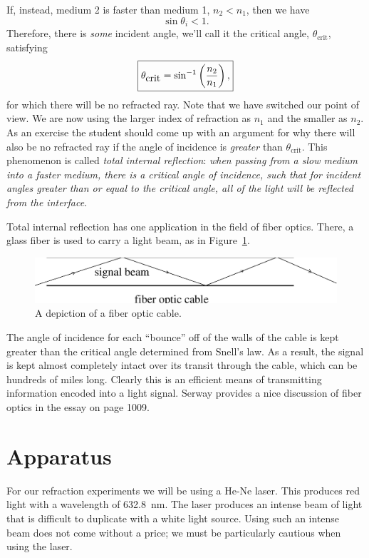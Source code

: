 If, instead, medium 2 is faster than medium 1, $n_2<n_1$, then we have
$$
\sin\theta_i <1.
$$ 
Therefore, there is {\it some} incident angle, we'll call it the critical 
angle, $\theta_{\mbox{crit}}$, satisfying
\begin{equation}
\fbox{$ \displaystyle \theta_{\mbox{crit}}=\sin^{-1}\left(\frac{n_2}{n_1}\right), $}
\label{eq:opt:totintref}
\end{equation}  
for which there will be no refracted ray. Note that
we have switched our point of view.  We are now using the larger index
of refraction as $n_1$ and the smaller as $n_2$.
As an exercise the student should
come up with an argument for why there will also be no refracted ray if the 
angle of incidence is {\it greater} than $\theta_{\mbox{crit}}$. This 
phenomenon is called {\it total internal reflection}: {\it when passing from a 
slow medium into a faster medium, there is a critical angle of incidence, such 
that for incident angles greater than or equal to the critical angle, all of 
the light will be reflected from the interface}.

Total internal reflection has one application in the field of fiber optics.
There, a glass fiber is used to carry a light beam, as in 
Figure~\ref{fig:opt:fiber}.
\begin{figure}[htb]
\centering 
\epsfxsize=12cm \includegraphics[scale=0.6]{8_refraction/fibopt.eps}
\caption{A depiction of a fiber optic cable.}
\label{fig:opt:fiber}
\end{figure}
The angle of incidence for each ``bounce'' off of the walls of the cable is
kept greater than the critical angle determined from Snell's law. As a result,
the signal is kept almost completely intact over its transit through the cable,
which can be hundreds of miles long.  Clearly this is an efficient means of
transmitting information encoded into a light signal. Serway provides a nice
discussion of fiber optics in the essay on page 1009.


\section{Apparatus}

For our refraction experiments we will be using a He-Ne laser.  This produces
red light with a wavelength of 632.8~nm.  The laser produces an intense
beam of light that is difficult to duplicate with a white light source.  Using
such an intense beam does not come without a price; we must be particularly 
cautious when using the laser.


